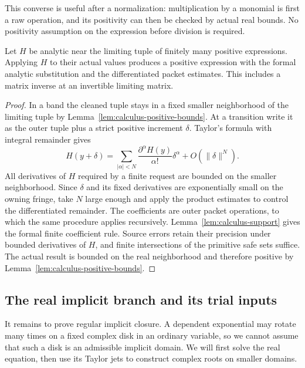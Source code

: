 This converse is useful after a normalization: multiplication by a monomial
is first a raw operation, and its positivity can then be checked by actual
real bounds.  No positivity assumption on the expression before division
is required.

\begin{lemma}
\label{lem:calculus-analytic}
Let $H$ be analytic near the limiting tuple of finitely many positive
expressions.  Applying $H$ to their actual values produces a positive
expression with the formal analytic substitution and the differentiated
packet estimates.  This includes a matrix inverse at an invertible
limiting matrix.
\end{lemma}

\begin{proof}
In a band the cleaned tuple stays in a fixed smaller neighborhood of the
limiting tuple by Lemma~\ref{lem:calculus-positive-bounds}.  At a transition
write it as the outer tuple plus a strict positive increment $\delta$.
Taylor's formula with integral remainder gives
\[
 H(y+\delta)=\sum_{|\alpha|<N}
       \frac{\partial^\alpha H(y)}{\alpha!}\delta^\alpha
       +O(\|\delta\|^N).
\]
All derivatives of $H$ required by a finite request are bounded on the
smaller neighborhood.  Since $\delta$ and its fixed derivatives are
exponentially small on the owning fringe, take $N$ large enough and apply
the product estimates to control the differentiated remainder.  The
coefficients are outer packet operations, to which the same procedure
applies recursively.  Lemma~\ref{lem:calculus-support} gives the formal
finite coefficient rule.  Source errors retain their precision under
bounded derivatives of $H$, and finite intersections of the primitive safe
sets suffice.  The actual result is bounded on the real neighborhood and
therefore positive by Lemma~\ref{lem:calculus-positive-bounds}.
\end{proof}

\subsection{The real implicit branch and its trial inputs}

It remains to prove regular implicit closure.  A dependent exponential
may rotate many times on a fixed complex disk in an ordinary variable,
so we cannot assume that such a disk is an admissible implicit domain.
We will first solve the real equation, then use its Taylor jets to
construct complex roots on smaller domains.

